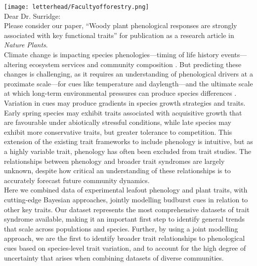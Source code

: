 \documentclass[11pt,a4paper]{article}
\begin{document}

\noindent \texttt{[image: letterhead/Facultyofforestry.png]}
\vspace{1ex}\\

\noindent Dear Dr. Surridge:
\vspace{1.5ex}\\
\noindent Please consider our paper, ``Woody plant phenological responses are strongly associated with key functional traits'' for publication as a research article in \emph{Nature Plants}. 
\vspace{1.5ex}\\ 
\noindent Climate change is impacting species phenologies---timing of life history events---altering ecosystem services and community composition \citep{Cleland2007a,Beard2019,Gu2022}. But predicting these changes is challenging, as it requires an understanding of phenological drivers at a proximate scale---for cues like temperature and daylength---and the ultimate scale at which long-term environmental pressures can produce species differences \citep{Ovaskainen2013,Wolkovich2021}.  Variation in cues may produce gradients in species growth strategies and traits. Early spring species may exhibit traits associated with acquisitive growth that are favourable under abiotically stressful conditions, while late species may exhibit more conservative traits, but greater tolerance to competition. This extension of the existing trait frameworks to include phenology is intuitive, but as a highly variable trait, phenology has often been excluded from trait studies. The relationships between phenology and broader trait syndromes are largely unknown, despite how critical an understanding of these relationships is to accurately forecast future community dynamics.
\vspace{1.5ex}\\
\noindent Here we combined data of experimental leafout phenology and plant traits, with cutting-edge Bayesian approaches, jointly modelling budburst cues in relation to other key traits. Our dataset represents the most comprehensive datasets of trait syndrome available, making it an important first step to identify general trends that scale across populations and species. Further, by using a joint modelling approach, we are the first to identify broader trait relationships to phenological cues based on species-level trait variation, and to account for the high degree of uncertainty that arises when combining datasets of diverse communities.
\end{document}

